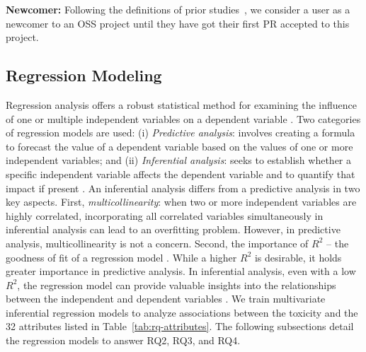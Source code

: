  \textbf {Newcomer:}
Following the definitions of prior studies~\cite{steinmacher2013newcomers,subramanian2020analyzing}, we consider a user as a newcomer to an OSS project until they have got their first PR accepted to this project.


\subsection{Regression Modeling}

Regression analysis offers a robust statistical method for examining the influence of one or multiple independent variables on a dependent variable \cite{foley2018regression}. Two categories of regression models are used: (i) \textit{Predictive analysis}: involves creating a formula to forecast the value of a dependent variable based on the values of one or more independent variables; and (ii) \textit{Inferential analysis}: seeks to establish whether a specific independent variable affects the dependent variable and to quantify that impact if present \cite{allison2014prediction}. An inferential analysis differs from a predictive analysis in two key aspects. First, \emph{multicollinearity}: when two or more independent variables are highly correlated, incorporating all correlated variables simultaneously in inferential analysis can lead to an overfitting problem. However, in predictive analysis, multicollinearity is not a concern. Second, the importance of $R^2$ -- the goodness of fit of a regression model \cite{helland1987interpretation}. While a higher \emph{$R^2$} is desirable, it holds greater importance in predictive analysis. In inferential analysis, even with a low $R^2$, the regression model can provide valuable insights into the relationships between the independent and dependent variables \cite{allison2014prediction}. 
We train multivariate inferential regression models to analyze associations between the toxicity and the 32 attributes listed in Table~\ref{tab:rq-attributes}. The following subsections detail the regression models to answer RQ2, RQ3, and RQ4.



